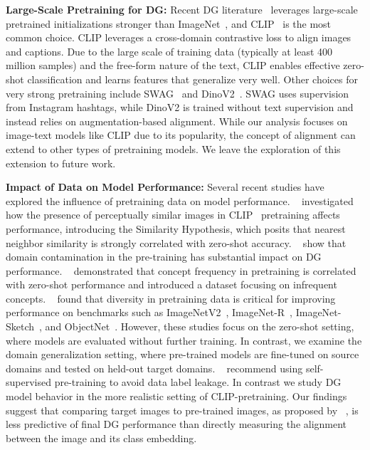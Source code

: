 \documentclass{article} %
\begin{document}
\textbf{Large-Scale Pretraining  for DG:} Recent DG literature~\citep{cho2023PromptStyler,cha2022miro,addepalli2024leveraging,mao2024context,arpit2022ensemble} leverages large-scale pretrained initializations stronger than ImageNet~\citep{ILSVRC15}, and CLIP~\citep{radford2021learning} is the most common choice. CLIP leverages a cross-domain contrastive loss to align images and captions. Due to the large scale of training data (typically at least 400 million samples) and the free-form nature of the text, CLIP enables effective zero-shot classification and learns features that generalize very well. Other choices for very strong pretraining include SWAG~\citep{singh2022revisiting} and DinoV2~\citep{oquab2023dinov2}. SWAG uses supervision from Instagram hashtags, while DinoV2 is trained without text supervision and instead relies on augmentation-based alignment. While our analysis focuses on image-text models like CLIP due to its popularity, the concept of alignment can  extend to other types of pretraining models. We leave the exploration of this extension to future work.

\textbf{Impact of Data on Model Performance:} Several recent studies have explored the influence of pretraining data on model performance. ~\citet{mayilvahanan2024does} investigated how the presence of perceptually similar images in CLIP~\citep{radford2021learning} pretraining affects performance, introducing the Similarity Hypothesis, which posits that nearest neighbor similarity is strongly correlated with zero-shot accuracy. ~\citet{mayilvahanan2025in} show that domain contamination in the pre-training has substantial impact on DG performance. ~\citet{udandarao2024no} demonstrated that concept frequency in pretraining is correlated with zero-shot performance and introduced a dataset focusing on infrequent concepts. ~\citet{fang2022data} found that diversity in pretraining data is critical for improving performance on benchmarks such as ImageNetV2~\citep{recht2019imagenet}, ImageNet-R~\citep{hendrycks2021many}, ImageNet-Sketch~\citep{wang2019learning}, and ObjectNet~\citep{barbu2019objectnet}. However, these studies focus on the zero-shot setting, where models are evaluated without further training. In contrast, we examine the domain generalization setting, where pre-trained models are fine-tuned on source domains and tested on held-out target domains.  ~\citet{yu2024rethinking} recommend using self-supervised pre-training to avoid data label leakage. In contrast we study DG model behavior in the more realistic setting of CLIP-pretraining.  Our findings suggest that comparing target images to pre-trained images, as proposed by ~\citet{mayilvahanan2024does}, is less predictive of final DG performance than directly measuring the alignment between the image and its class embedding. 
\end{document}
